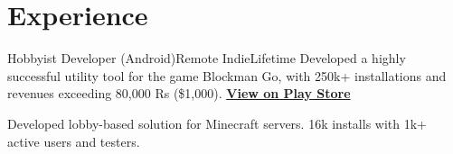 \section{Experience}
  \resumeSubHeadingListStart
    \resumeSubheading
      {Hobbyist Developer (Android)}{Remote}
      {Indie}{Lifetime}
      \resumeItemListStart
        {Developed a highly successful utility tool for the game Blockman Go, with 250k+ installations and revenues exceeding 80,000 Rs (\$1,000). \href{https://play.google.com/store/apps/details?id=cf.androefi.xenone}{\textbf{View on Play Store}}}

        {Developed lobby-based solution for Minecraft servers. 16k installs with 1k+ active users and testers.}
    \resumeItemListEnd
  \resumeSubHeadingListEnd